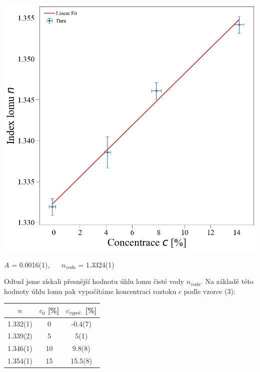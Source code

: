 \documentclass[a4paper,11pt]{article}
\begin{document}
\begin{minipage}[t]{0.5\textwidth}
                \includegraphics[scale=0.3]{lom}
                \captionsetup{justification=centering, font=footnotesize}
                \label{fig:lom}
                \raggedright
                \par \begin{center}
                    $A$ = 0.0016(1), ~~ $n_{voda}$ = 1.3324(1)
                \end{center}
                Odtud jsme získali přesnější hodnotu úhlu lomu čisté vody $n_{voda}$. Na základě této hodnoty úhlu lomu pak vypočítáme koncentraci roztoku $c$ podle vzorce (3): 
                \vspace{10pt}
                \par \centering
                \begin{tabular}{|c|c|c|}
                    \hline
                    $n$ & $c_0$ [\%] & $c_{vypoč.}$ [\%]\\
                    \hline
                    1.332(1) & 0 & -0.4(7) \\
                    \hline
                    1.339(2) & 5 & 5(1) \\
                    \hline
                    1.346(1) & 10 & 9.8(8) \\
                    \hline
                    1.354(1) & 15 & 15.5(8) \\
                    \hline
                \end{tabular}
                \captionsetup{justification=centering, font=footnotesize}
                \vspace{10pt}
                \raggedright
    \end{minipage}
\end{document}

